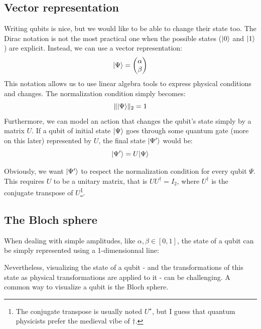 \documentclass[12pt,a4paper]{article}
\theoremstyle{definition}
\DeclarePairedDelimiter\ket{\lvert}{\rangle}
\begin{document}
\subsection{Vector representation}
Writing qubits is nice, but we would like to be able to change their state too. The Dirac notation is not the most practical one when the possible states ($\ket{0}$ and $\ket{1}$) are explicit. Instead, we can use a vector representation:
\begin{equation*}
    \ket{\Psi} = \begin{pmatrix}\alpha\\\beta\end{pmatrix}
\end{equation*}
This notation allows us to use linear algebra tools to express physical conditions and changes. The normalization condition simply becomes:
\begin{equation*}
    \|\ket{\Psi}\|_2 = 1
\end{equation*}
Furthermore, we can model an action that changes the qubit's state simply by a matrix $U$. If a qubit of initial state $\ket{\Psi}$ goes through some quantum gate (more on this later) represented by $U$, the final state $\ket{\Psi'}$ would be:
\begin{equation*}
    \ket{\Psi'} = U\ket{\Psi}
\end{equation*}

Obviously, we want $\ket{\Psi'}$ to respect the normalization condition for every qubit $\Psi$. This requires $U$ to be a unitary matrix, that is $UU^\dagger = I_2$, where $U^\dagger$ is the conjugate transpose of $U$\footnote{The conjugate transpose is usually noted $U^\star$, but I guess that quantum physicists prefer the medieval vibe of $\dagger$.}.

\subsection{The Bloch sphere}
When dealing with simple amplitudes, like $\alpha, \beta\in [0, 1]$, the state of a qubit can be simply represented using a 1-dimensionnal line:

Nevertheless, visualizing the state of a qubit - and the transformations of this state as physical transformations are applied to it - can be challenging. A common way to visualize a qubit is the Bloch sphere.
\end{document}
